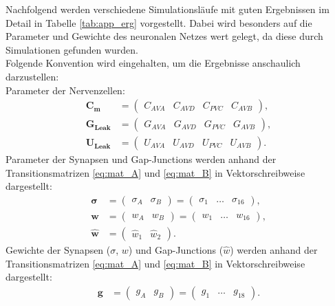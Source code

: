 	Nachfolgend werden verschiedene Simulationsläufe mit guten Ergebnissen im Detail in Tabelle \ref{tab:app_erg} vorgestellt. Dabei wird besonders auf die Parameter und Gewichte des neuronalen Netzes wert gelegt, da diese durch Simulationen gefunden wurden.\\
	Folgende Konvention wird eingehalten, um die Ergebnisse anschaulich darzustellen:\\
	Parameter der Nervenzellen:
	\begin{align}
		\boldsymbol{C_m} &= \begin{pmatrix}C_{AVA} & C_{AVD} & C_{PVC} & C_{AVB}\end{pmatrix},\\
		\boldsymbol{G_{Leak}} &= \begin{pmatrix}G_{AVA} & G_{AVD} & G_{PVC} & G_{AVB}\end{pmatrix},\\
		\boldsymbol{U_{Leak}} &= \begin{pmatrix}U_{AVA} & U_{AVD} & U_{PVC} & U_{AVB}\end{pmatrix}.
	\end{align}
	Parameter der Synapsen und Gap-Junctions  werden anhand der Transitionsmatrizen \ref{eq:mat_A} und \ref{eq:mat_B} in Vektorschreibweise dargestellt:
	\begin{align}
		\boldsymbol{\sigma} &= \begin{pmatrix}\sigma_A & \sigma_B\end{pmatrix} = \begin{pmatrix}\sigma_1 & \dots & \sigma_{16}\end{pmatrix},\\
		\boldsymbol{w} &= \begin{pmatrix}w_A & w_B\end{pmatrix} = \begin{pmatrix}w_1 & \dots & w_{16}\end{pmatrix},\\
		\boldsymbol{\hat{w}} &= \begin{pmatrix}\hat{w}_1 & \hat{w}_{2}\end{pmatrix}.
	\end{align}
	Gewichte der Synapsen ($\sigma$, $w$) und Gap-Junctions ($\hat{w}$) werden anhand der Transitionsmatrizen \ref{eq:mat_A} und \ref{eq:mat_B} in Vektorschreibweise dargestellt:
	\begin{align}
		\boldsymbol{g} &= \begin{pmatrix}g_A & g_B\end{pmatrix} = \begin{pmatrix}g_1 & \dots & g_{18}\end{pmatrix}.
	\end{align}
